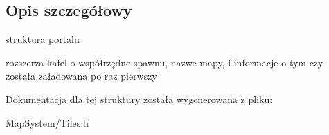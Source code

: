 \subsection{Opis szczegółowy}
struktura portalu 

rozszerza kafel o współrzędne spawnu, nazwe mapy, i informacje o tym czy została załadowana po raz pierwszy 

Dokumentacja dla tej struktury została wygenerowana z pliku\-:\begin{DoxyCompactItemize}
\item 
Map\-System/Tiles.\-h\end{DoxyCompactItemize}
